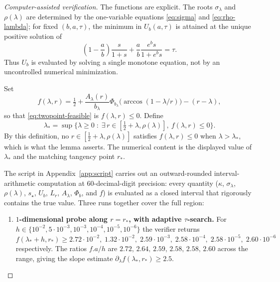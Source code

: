 \documentclass[11pt]{article}
\begin{document}
\begin{proof}[Computer-assisted verification]
The functions are explicit. The roots \(\sigma_\lambda\) and \(\rho(\lambda)\)
are determined by the one-variable equations \eqref{eq:sigma} and
\eqref{eq:rho-lambda}; for fixed \((b,a,\tau)\), the minimum in
\(U_b(a,\tau)\) is attained at the unique positive solution of
\[
        \left(1-\frac ab\right)\frac{s}{1+s}
        +\frac ab\frac{e^bs}{1+e^bs}=\tau.
        \tag{5.7}\label{eq:s-stationary}
\]
Thus \(U_b\) is evaluated by solving a single monotone equation, not by an
uncontrolled numerical minimization.

Set
\[
        f(\lambda,r)
        =\tfrac12+\frac{A_\lambda(r)}{b_\lambda}
                \Phi_{b_\lambda}\!\bigl(\arccos(1-\lambda/r)\bigr)
        -(r-\lambda),
\]
so that \eqref{eq:twopoint-feasible} is $f(\lambda,r)\leq 0$. Define
\[
        \lambda_*
        =\sup\bigl\{\lambda\geq 0\;:\;
        \exists\,r\in[\tfrac12+\lambda,\rho(\lambda)],\ f(\lambda,r)\leq 0\bigr\}.
\]
By this definition, no $r\in[\tfrac12+\lambda,\rho(\lambda)]$ satisfies
$f(\lambda,r)\leq 0$ when $\lambda>\lambda_*$, which is what the lemma
asserts. The numerical content is the displayed value of $\lambda_*$ and the
matching tangency point $r_*$.

The script in Appendix~\ref{app:script} carries out an outward-rounded
interval-arithmetic computation at $60$-decimal-digit precision: every
quantity ($\kappa$, $\sigma_\lambda$, $\rho(\lambda)$, $s_\star$, $U_b$,
$L_r$, $A_\lambda$, $\Phi_b$, and $f$) is evaluated as a closed interval
that rigorously contains the true value. Three runs together cover the
full region:
\begin{enumerate}
\item \textbf{$1$-dimensional probe along $r=r_*$, with adaptive
$\tau$-search.} For
$h\in\{10^{-2},5\cdot10^{-3},10^{-3},10^{-4},10^{-5},10^{-6}\}$ the
verifier returns
$f(\lambda_*+h,r_*)\geq 2.72\cdot10^{-2},\;1.32\cdot10^{-2},\;2.59\cdot10^{-3},
\;2.58\cdot10^{-4},\;2.58\cdot10^{-5},\;2.60\cdot10^{-6}$ respectively.
The ratios $f.a/h$ are $2.72,\,2.64,\,2.59,\,2.58,\,2.58,\,2.60$
across the range, giving the slope estimate
$\partial_\lambda f(\lambda_*,r_*)\geq 2.5$.


\end{enumerate}
\end{proof}
\end{document}
